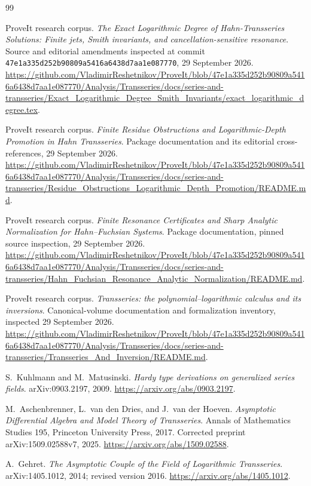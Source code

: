 \documentclass[11pt,a4paper]{article}
\numberwithin{equation}{section}
\theoremstyle{definition}
\theoremstyle{remark}\newtheorem{remark}[theorem]{Remark}
\newcommand{\snap}{47e1a335d252b90809a5416a6438d7aa1e087770}
\begin{document}
\clearpage
\begin{thebibliography}{99}
\raggedright
{}
ProveIt research corpus.
\emph{The Exact Logarithmic Degree of Hahn-Transseries Solutions: Finite jets, Smith invariants, and cancellation-sensitive resonance}.
Source and editorial amendments inspected at commit \texttt{\snap}, 29 September 2026.
\url{https://github.com/VladimirReshetnikov/ProveIt/blob/47e1a335d252b90809a5416a6438d7aa1e087770/Analysis/Transseries/docs/series-and-transseries/Exact_Logarithmic_Degree_Smith_Invariants/exact_logarithmic_degree.tex}.

ProveIt research corpus.
\emph{Finite Residue Obstructions and Logarithmic-Depth Promotion in Hahn Transseries}.
Package documentation and its editorial cross-references, 29 September 2026.
\url{https://github.com/VladimirReshetnikov/ProveIt/blob/47e1a335d252b90809a5416a6438d7aa1e087770/Analysis/Transseries/docs/series-and-transseries/Residue_Obstructions_Logarithmic_Depth_Promotion/README.md}.

ProveIt research corpus.
\emph{Finite Resonance Certificates and Sharp Analytic Normalization for Hahn--Fuchsian Systems}.
Package documentation, pinned source inspection, 29 September 2026.
\url{https://github.com/VladimirReshetnikov/ProveIt/blob/47e1a335d252b90809a5416a6438d7aa1e087770/Analysis/Transseries/docs/series-and-transseries/Hahn_Fuchsian_Resonance_Analytic_Normalization/README.md}.

ProveIt research corpus.
\emph{Transseries: the polynomial--logarithmic calculus and its inversions}.
Canonical-volume documentation and formalization inventory, inspected 29 September 2026.
\url{https://github.com/VladimirReshetnikov/ProveIt/blob/47e1a335d252b90809a5416a6438d7aa1e087770/Analysis/Transseries/docs/series-and-transseries/Transseries_And_Inversion/README.md}.

S.~Kuhlmann and M.~Matusinski.
\emph{Hardy type derivations on generalized series fields}.
arXiv:0903.2197, 2009.
\url{https://arxiv.org/abs/0903.2197}.

M.~Aschenbrenner, L.~van den Dries, and J.~van der Hoeven.
\emph{Asymptotic Differential Algebra and Model Theory of Transseries}.
Annals of Mathematics Studies 195, Princeton University Press, 2017.
Corrected preprint arXiv:1509.02588v7, 2025.
\url{https://arxiv.org/abs/1509.02588}.

A.~Gehret.
\emph{The Asymptotic Couple of the Field of Logarithmic Transseries}.
arXiv:1405.1012, 2014; revised version 2016.
\url{https://arxiv.org/abs/1405.1012}.


\end{thebibliography}
\end{document}
